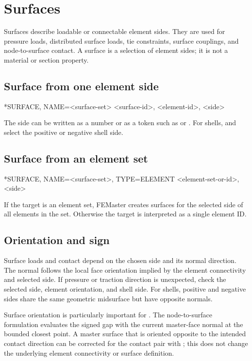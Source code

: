 \chapter{Surfaces}

Surfaces describe loadable or connectable element sides. They are used for pressure loads, distributed surface loads, tie constraints, surface couplings, and node-to-surface contact. A surface is a selection of element sides; it is not a material or section property.

\section{Surface from one element side}

\begin{syntax}
*SURFACE, NAME=<surface-set>
<surface-id>, <element-id>, <side>
\end{syntax}

The side can be written as a number or as a token such as  or . For shells,  and  select the positive or negative shell side.

\section{Surface from an element set}

\begin{syntax}
*SURFACE, NAME=<surface-set>, TYPE=ELEMENT
<element-set-or-id>, <side>
\end{syntax}

If the target is an element set, FEMaster creates surfaces for the selected side of all elements in the set. Otherwise the target is interpreted as a single element ID.

\section{Orientation and sign}

Surface loads and contact depend on the chosen side and its normal direction. The normal follows the local face orientation implied by the element connectivity and selected side. If pressure or traction direction is unexpected, check the selected side, element orientation, and shell side. For shells, positive and negative sides share the same geometric midsurface but have opposite normals.

Surface orientation is particularly important for . The node-to-surface formulation evaluates the signed gap with the current master-face normal at the bounded closest point. A master surface that is oriented opposite to the intended contact direction can be corrected for the contact pair with ; this does not change the underlying element connectivity or surface definition.

